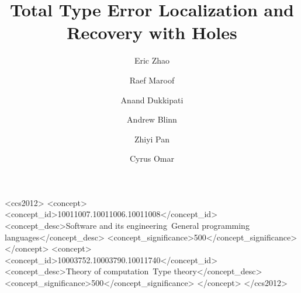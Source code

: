 \documentclass[acmsmall,prologue,dvipsnames]{acmart}
\begin{document}
\title{Total Type Error Localization and Recovery with Holes}

\author{Eric Zhao}

\author{Raef Maroof}
\orcid{}

\author{Anand Dukkipati}

\author{Andrew Blinn}

\author{Zhiyi Pan}
\orcid{}

\author{Cyrus Omar}



\begin{CCSXML}
<ccs2012>
   <concept>
       <concept_id>10011007.10011006.10011008</concept_id>
       <concept_desc>Software and its engineering~General programming languages</concept_desc>
       <concept_significance>500</concept_significance>
       </concept>
   <concept>
       <concept_id>10003752.10003790.10011740</concept_id>
       <concept_desc>Theory of computation~Type theory</concept_desc>
       <concept_significance>500</concept_significance>
       </concept>
 </ccs2012>
\end{CCSXML}



\maketitle









\end{document}
